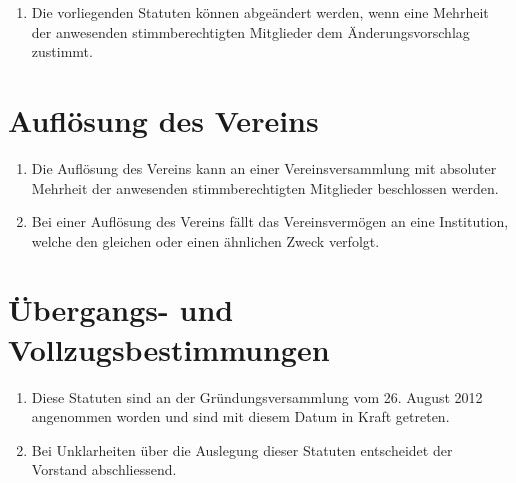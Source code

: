 \documentclass[10pt,a4paper,parskip,fleqn]{scrartcl}
\newcommand{\ol}{\begin{enumerate}[itemsep=-0.2em,topsep=-0.2em]}
\newcommand{\lo}{\end{enumerate}}
\newcommand{\li}{\item}
\begin{document}
\ol
	\li Die vorliegenden Statuten können abgeändert werden, wenn eine Mehrheit der
	anwesenden stimmberechtigten Mitglieder dem Änderungsvorschlag zustimmt.
\lo


\section{Auflösung des Vereins}

\ol
	\li Die Auflösung des Vereins kann an einer Vereinsversammlung mit absoluter
	Mehrheit der anwesenden stimmberechtigten Mitglieder beschlossen werden.
	\li Bei einer Auflösung des Vereins fällt das Vereinsvermögen an eine
	Institution, welche den gleichen oder einen ähnlichen Zweck verfolgt.
\lo


\section{Übergangs- und Vollzugsbestimmungen}

\ol
	\li Diese Statuten sind an der Gründungsversammlung vom 26. August 2012
	angenommen worden und sind mit diesem Datum in Kraft getreten.
	\li Bei Unklarheiten über die Auslegung dieser Statuten entscheidet der
	Vorstand abschliessend.
\lo
\end{document}
